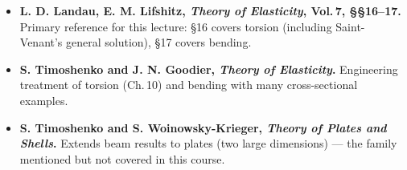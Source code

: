 \documentclass[../main.tex]{subfiles}
\begin{document}
\begin{itemize}
    \item \textbf{L. D. Landau, E. M. Lifshitz, \textit{Theory of Elasticity}, Vol.\,7, §§16--17.} Primary reference for this lecture: §16 covers torsion (including Saint-Venant's general solution), §17 covers bending.
    \item \textbf{S. Timoshenko and J. N. Goodier, \textit{Theory of Elasticity}.} Engineering treatment of torsion (Ch.\,10) and bending with many cross-sectional examples.
    \item \textbf{S. Timoshenko and S. Woinowsky-Krieger, \textit{Theory of Plates and Shells}.} Extends beam results to plates (two large dimensions) — the family mentioned but not covered in this course.
\end{itemize}
\end{document}
